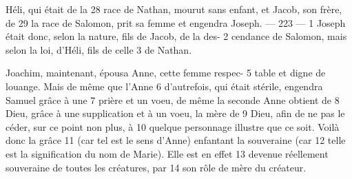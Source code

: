 Héli, qui était de la	 
28	 	race de Nathan, mourut sans enfant, et Jacob, son frère, de	 
29	 	la race de Salomon, prit sa femme et engendra Joseph.	 
 	--- 223 ---	 
1	 	Joseph était donc, selon la nature, fils de Jacob, de la des-	 
2	 	cendance de Salomon, mais selon la loi, d'Héli, fils de celle	 
3	 	de Nathan.

Joachim, maintenant, épousa Anne, cette femme respec-	 
5	 	table et digne de louange. Mais de même que l'Anne	 
6	 	d'autrefois, qui était stérile, engendra Samuel grâce à une	 
7	 	prière et un voeu, de même la seconde Anne obtient de	 
8	 	Dieu, grâce à une supplication et à un voeu, la mère de	 
9	 	Dieu, afin de ne pas le céder, sur ce point non plus, à	 
10	 	quelque personnage illustre que ce soit. Voilà donc la grâce	 
11	 	(car tel est le sens d'Anne) enfantant la souveraine (car	 
12	 	telle est la signification du nom de Marie). Elle est en effet	 
13	 	devenue réellement souveraine de toutes les créatures, par	 
14	 	son rôle de mère du créateur.
